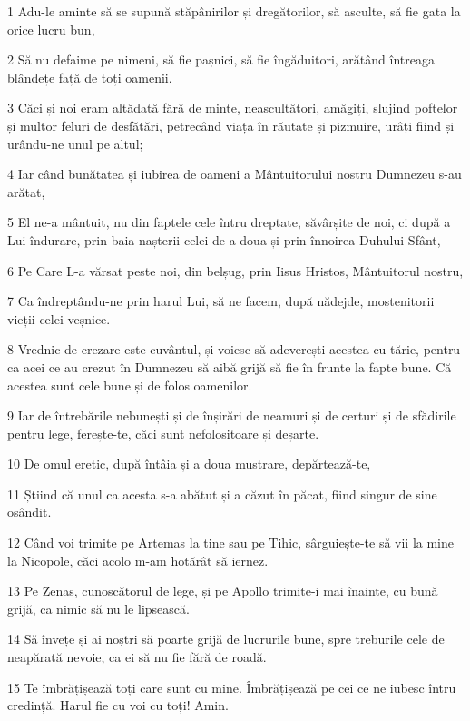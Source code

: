 \par 1 Adu-le aminte să se supună stăpânirilor și dregătorilor, să asculte, să fie gata la orice lucru bun,
\par 2 Să nu defaime pe nimeni, să fie pașnici, să fie îngăduitori, arătând întreaga blândețe față de toți oamenii.
\par 3 Căci și noi eram altădată fără de minte, neascultători, amăgiți, slujind poftelor și multor feluri de desfătări, petrecând viața în răutate și pizmuire, urâți fiind și urându-ne unul pe altul;
\par 4 Iar când bunătatea și iubirea de oameni a Mântuitorului nostru Dumnezeu s-au arătat,
\par 5 El ne-a mântuit, nu din faptele cele întru dreptate, săvârșite de noi, ci după a Lui îndurare, prin baia nașterii celei de a doua și prin înnoirea Duhului Sfânt,
\par 6 Pe Care L-a vărsat peste noi, din belșug, prin Iisus Hristos, Mântuitorul nostru,
\par 7 Ca îndreptându-ne prin harul Lui, să ne facem, după nădejde, moștenitorii vieții celei veșnice.
\par 8 Vrednic de crezare este cuvântul, și voiesc să adeverești acestea cu tărie, pentru ca acei ce au crezut în Dumnezeu să aibă grijă să fie în frunte la fapte bune. Că acestea sunt cele bune și de folos oamenilor.
\par 9 Iar de întrebările nebunești și de înșirări de neamuri și de certuri și de sfădirile pentru lege, ferește-te, căci sunt nefolositoare și deșarte.
\par 10 De omul eretic, după întâia și a doua mustrare, depărtează-te,
\par 11 Știind că unul ca acesta s-a abătut și a căzut în păcat, fiind singur de sine osândit.
\par 12 Când voi trimite pe Artemas la tine sau pe Tihic, sârguiește-te să vii la mine la Nicopole, căci acolo m-am hotărât să iernez.
\par 13 Pe Zenas, cunoscătorul de lege, și pe Apollo trimite-i mai înainte, cu bună grijă, ca nimic să nu le lipsească.
\par 14 Să învețe și ai noștri să poarte grijă de lucrurile bune, spre treburile cele de neapărată nevoie, ca ei să nu fie fără de roadă.
\par 15 Te îmbrățișează toți care sunt cu mine. Îmbrățișează pe cei ce ne iubesc întru credință. Harul fie cu voi cu toți! Amin.


